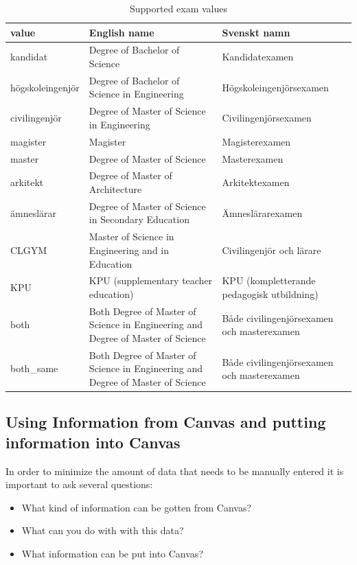 \begin{table}[!ht]
    \caption{Supported exam values}
    \label{tab:examValues}
    \begin{tabular}{L{3cm}|L{4.5cm}|L{4.5cm}}
      \textbf{value} & \textbf{English name} & \textbf{Svenskt namn}\\
      \hline
kandidat & Degree of Bachelor of Science & Kandidatexamen\\
högskoleingenjör & Degree of Bachelor of Science in Engineering & Högskoleingenjörsexamen\\
civilingenjör & Degree of Master of Science in Engineering & Civilingenjörsexamen\\
magister & Magister & Magisterexamen\\
master & Degree of Master of Science & Masterexamen\\
arkitekt & Degree of Master of Architecture & Arkitektexamen\\
ämneslärar & Degree of Master of Science in Secondary Education & Ämneslärarexamen\\
CLGYM & Master of Science in Engineering and in Education & Civilingenjör och lärare\\
KPU & KPU (supplementary teacher education) & KPU (kompletterande pedagogisk utbildning)\\
both & Both Degree of Master of Science in Engineering and Degree of Master of Science &
        Både civilingenjörsexamen och masterexamen\\
both\_same & Both Degree of Master of Science in Engineering and Degree of Master of Science & Både civilingenjörsexamen och masterexamen\\
\hline
   \end{tabular}
\end{table}
\FloatBarrier


\subsection{Using Information from Canvas and putting information into Canvas}
In order to minimize the amount of data that needs to be manually entered it is important to ask several questions:
\begin{itemize}
    \item What kind of information can be gotten from Canvas?
    \item What can you do with with this data?
    \item What information can be put into Canvas?
\end{itemize}

